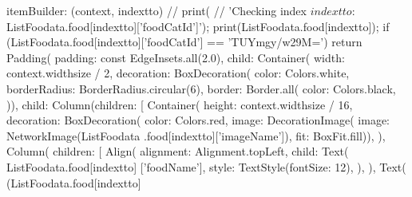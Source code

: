                                     itemBuilder: (context, indextto) {
                                      // print(
                                      //     'Checking index $indextto: ${ListFoodata.food[indextto]['foodCatId']}');
                                      print(ListFoodata.food[indextto]);
                                      if (ListFoodata.food[indextto]['foodCatId'] ==
                                          'TUYmgy/w29M=') {
                                        return Padding(
                                          padding: const EdgeInsets.all(2.0),
                                          child: Container(
                                            width: context.widthsize / 2,
                                            decoration: BoxDecoration(
                                                color: Colors.white,
                                                borderRadius: BorderRadius.circular(6),
                                                border: Border.all(
                                                  color: Colors.black,
                                                )),
                                            child: Column(children: [
                                              Container(
                                                height: context.widthsize / 16,
                                                decoration: BoxDecoration(
                                                    color: Colors.red,
                                                    image: DecorationImage(
                                                        image: NetworkImage(ListFoodata
                                                            .food[indextto]['imageName']),
                                                        fit: BoxFit.fill)),
                                              ),
                                              Column(
                                                children: [
                                                  Align(
                                                    alignment: Alignment.topLeft,
                                                    child: Text(
                                                      ListFoodata.food[indextto]
                                                          ['foodName'],
                                                      style: TextStyle(fontSize: 12),
                                                    ),
                                                  ),
                                                  Text(
                                                    (ListFoodata.food[indextto]
}}
